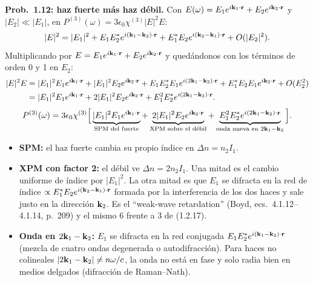  \textbf{Prob.~1.12: haz fuerte más haz débil.} Con $E(\omega)=E_1e^{i\mathbf k_1\cdot\mathbf r}+E_2e^{i\mathbf k_2\cdot\mathbf r}$ y $|E_2|\ll|E_1|$, en
$P^{(3)}(\omega)=3\epsilon_0\chi^{(3)}|E|^2E$:
\[
|E|^2=|E_1|^2+E_1E_2^*e^{i(\mathbf k_1-\mathbf k_2)\cdot\mathbf r}+E_1^*E_2e^{i(\mathbf k_2-\mathbf k_1)\cdot\mathbf r}+O(|E_2|^2).
\]
Multiplicando por $E=E_1e^{i\mathbf k_1\cdot\mathbf r}+E_2e^{i\mathbf k_2\cdot\mathbf r}$ y quedándonos con los términos de orden 0 y 1 en $E_2$:
\begin{align*}
|E|^2E&=|E_1|^2E_1e^{i\mathbf k_1\cdot\mathbf r}+|E_1|^2E_2e^{i\mathbf k_2\cdot\mathbf r}+E_1E_2^*E_1e^{i(2\mathbf k_1-\mathbf k_2)\cdot\mathbf r}+E_1^*E_2E_1e^{i\mathbf k_2\cdot\mathbf r}+O(E_2^2)\\
&=|E_1|^2E_1e^{i\mathbf k_1\cdot\mathbf r}+2|E_1|^2E_2e^{i\mathbf k_2\cdot\mathbf r}+E_1^2E_2^*e^{i(2\mathbf k_1-\mathbf k_2)\cdot\mathbf r}.
\end{align*}
\[
P^{(3)}(\omega)=3\epsilon_0\chi^{(3)}\Big[\underbrace{|E_1|^2E_1e^{i\mathbf k_1\cdot\mathbf r}}_{\text{SPM del fuerte}}
+\underbrace{2|E_1|^2E_2e^{i\mathbf k_2\cdot\mathbf r}}_{\text{XPM sobre el débil}}
+\underbrace{E_1^2E_2^*e^{i(2\mathbf k_1-\mathbf k_2)\cdot\mathbf r}}_{\text{onda nueva en }2\mathbf k_1-\mathbf k_2}\Big].
\]
\begin{itemize}
\item \textbf{SPM:} el haz fuerte cambia su propio índice en $\Delta n=n_2I_1$.
\item \textbf{XPM con factor 2:} el débil ve $\Delta n=2n_2I_1$. Una mitad es el cambio uniforme de índice por $|E_1|^2$. La otra mitad es que $E_1$ se difracta en la red de
índice $\propto E_1^*E_2e^{i(\mathbf k_2-\mathbf k_1)\cdot\mathbf r}$ formada por la interferencia de los dos haces y sale justo en la dirección $\mathbf k_2$. Es el ``weak-wave retardation''
(Boyd, ecs.~4.1.12–4.1.14, p.~209) y el mismo 6 frente a 3 de (1.2.17).
\item \textbf{Onda en $2\mathbf k_1-\mathbf k_2$:} $E_1$ se difracta en la red conjugada $E_1E_2^*e^{i(\mathbf k_1-\mathbf k_2)\cdot\mathbf r}$ (mezcla de cuatro ondas degenerada o autodifracción). Para
haces no colineales $|2\mathbf k_1-\mathbf k_2|\neq n\omega/c$, la onda no está en fase y solo radia bien en medios delgados (difracción de Raman--Nath).
\end{itemize}



